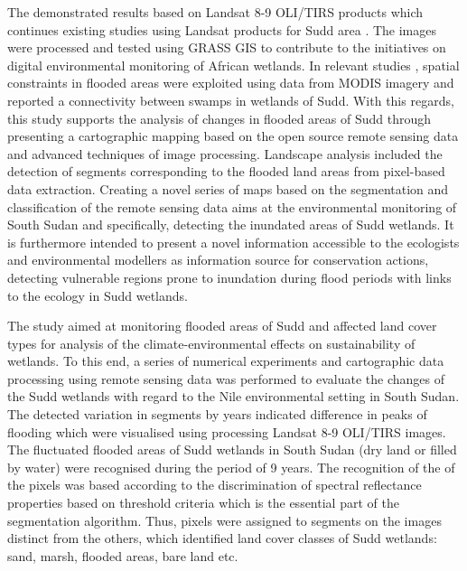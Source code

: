 \documentclass[analytics,article,submit,pdftex,moreauthors]{Definitions/mdpi}
\begin{document}
The demonstrated results based on Landsat 8-9 OLI/TIRS products which continues existing studies using Landsat products for Sudd area \cite{Petersenetal2008}. The images were processed and tested using GRASS GIS to contribute to the initiatives on digital environmental monitoring of African wetlands. In relevant studies \cite{DIVITTORIO2021100922}, spatial constraints in flooded areas were exploited using data from MODIS imagery and reported a connectivity between swamps in wetlands of Sudd. With this regards, this study supports the analysis of changes in flooded areas of Sudd through presenting a cartographic mapping based on the open source remote sensing data and advanced techniques of image processing. Landscape analysis included the detection of segments corresponding to the flooded land areas from pixel-based data extraction. Creating a novel series of maps based on the segmentation and classification of the remote sensing data aims at the environmental monitoring of South Sudan and specifically, detecting the inundated areas of Sudd wetlands. It is furthermore intended to present a novel information accessible to the ecologists and environmental modellers as information source for conservation actions, detecting vulnerable regions prone to inundation during flood periods with links to the ecology in Sudd wetlands. 

The study aimed at monitoring flooded areas of Sudd and affected land cover types for analysis of the climate-environmental effects on sustainability of wetlands. To this end, a series of numerical experiments and cartographic data processing using remote sensing data was performed to evaluate the changes of the Sudd wetlands with regard to the Nile environmental setting in South Sudan. The detected variation in segments by years indicated difference in peaks of flooding which were visualised using processing Landsat 8-9 OLI/TIRS images. The fluctuated flooded areas of Sudd wetlands in South Sudan (dry land or filled by water) were recognised during the period of 9 years. The recognition of the of the pixels was based according to the discrimination of spectral reflectance properties based on threshold criteria which is the essential part of the segmentation algorithm. Thus, pixels were assigned to segments on the images distinct from the others, which identified land cover classes of Sudd wetlands: sand, marsh, flooded areas, bare land etc.
\end{document}
